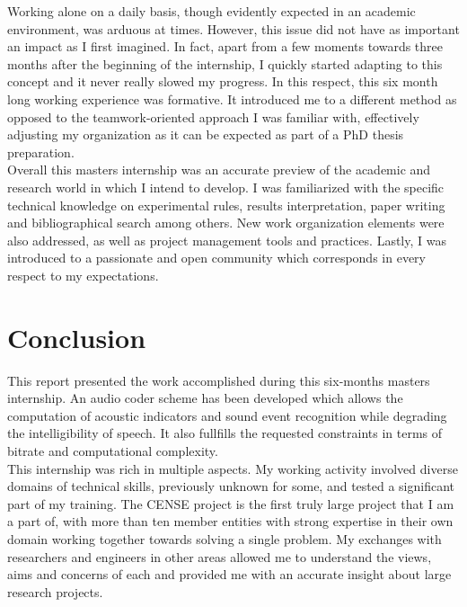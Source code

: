 \documentclass[12pt,times,onecolumn]{article}
\begin{document}
Working alone on a daily basis, though evidently expected in an academic environment, was arduous at times. However, this issue did not have as important an impact as I first imagined. In fact, apart from a few moments towards three months after the beginning of the internship, I quickly started adapting to this concept and it never really slowed my progress. In this respect, this six month long working experience was formative. It introduced me to a different method as opposed to the teamwork-oriented approach I was familiar with, effectively adjusting my organization as it can be expected as part of a PhD thesis preparation.\\

Overall this masters internship was an accurate preview of the academic and research world in which I intend to develop. I was familiarized with the specific technical knowledge on experimental rules, results interpretation, paper writing and bibliographical search among others. New work organization elements were also addressed, as well as project management tools and practices. Lastly, I was introduced to a passionate and open community which corresponds in every respect to my expectations.\\


\clearpage
\section*{Conclusion}
This report presented the work accomplished during this six-months masters internship. An audio coder scheme has been developed which allows the computation of acoustic indicators and sound event recognition while degrading the intelligibility of speech. It also fullfills the requested constraints in terms of bitrate and computational complexity.\\


This internship was rich in multiple aspects. My working activity involved diverse domains of technical skills, previously unknown for some, and tested a significant part of my training. The CENSE project is the first truly large project that I am a part of, with more than ten member entities with strong expertise in their own domain working together towards solving a single problem. My exchanges with researchers and engineers in other areas allowed me to understand the views, aims and concerns of each and provided me with an accurate insight about large research projects.\\
\end{document}
